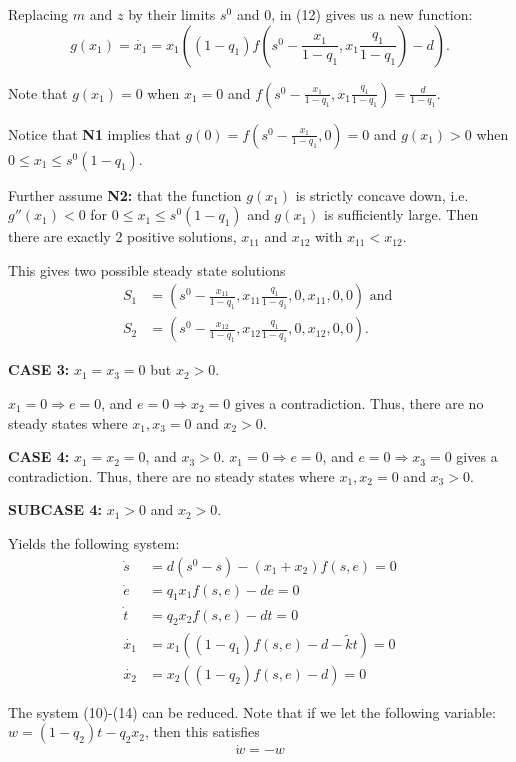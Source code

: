 \documentclass[12pt]{article}
\begin{document}
\noindent Replacing $m$ and $z$ by their limits $s^0$ and $0$, in (12) gives us a new function: $$g(x_1)=\dot{x_1}=x_1 ((1-q_1)f(s^0-\frac{x_1}{1-q_1},x_1 \frac{q_1}{1-q_1})-d).$$

\noindent Note that $g(x_1)= 0$ when $x_1=0$ and $f(s^0-\frac{x_1}{1-q_1},x_1 \frac{q_1}{1-q_1})=\frac{d}{1-q_1}$. 

\noindent Notice that \textbf{N1} implies that $g(0)=f(s^0-\frac{x_1}{1-q_1},0)=0$ and $g(x_1)>0$ when $0 \leq x_1 \leq s^0 (1-q_1)$. 

\noindent Further assume \textbf{N2:} that the function $g(x_1)$ is strictly concave down, i.e. $g''(x_1)<0$ for $0 \leq x_1 \leq s^0(1-q_1)$ and $g(x_1)$ is sufficiently large. Then there are exactly 2 positive solutions, $x_{11}$ and $x_{12}$ with $x_{11} < x_{12}$. 

\noindent This gives two possible steady state solutions \begin{align*} S_1&=(s^0- \frac{x_{11}}{1-q_1}, x_{11}\frac{q_1}{1-q_1},0,x_{11},0,0) \text{ and } \\
S_2&=(s^0- \frac{x_{12}}{1-q_1}, x_{12}\frac{q_1}{1-q_1},0,x_{12},0,0).
\end{align*}

\noindent \textbf{CASE 3: } $x_1=x_3=0$ but $x_2>0$. 

\noindent $x_1 =0 \Rightarrow e =0$, and $e=0 \Rightarrow x_2 =0$ gives a contradiction. Thus, there are no steady states where $x_1,x_3=0$ and $x_2>0$. 

\noindent \textbf{CASE 4: } $x_1=x_2=0$, and $x_3>0$. 
\noindent $x_1 =0 \Rightarrow e =0$, and $e=0 \Rightarrow x_3 =0$ gives a contradiction. Thus, there are no steady states where $x_1,x_2=0$ and $x_3>0$. 

\noindent \textbf{SUBCASE 4: } $x_1 >0$ and $x_2 >0$. 

\noindent Yields the following system: 
\begin{align}
\dot{s}&=d(s^0-s)-(x_1 + x_2) f(s,e)=0\\
\dot{e}&=q_1 x_1 f(s,e)-de=0\\
\dot{t}&=q_2 x_2 f(s,e) - dt=0\\
\dot{x_1} &= x_1((1-q_1)f(s,e)-d- \tilde{k}t)=0\\
\dot{x_2}&=x_2((1-q_2)f(s,e)-d)=0
\end{align}

\noindent The system (10)-(14) can be reduced. Note that if we let the following variable: $w=(1-q_2)t-q_2 x_2$, then this satisfies $$\dot{w}=-w$$
\end{document}
